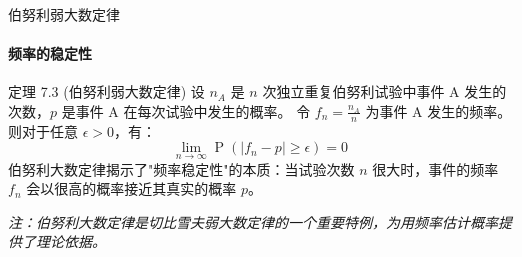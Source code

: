 \documentclass[UTF8]{beamer}
\DeclareMathOperator{\Prob}{\operatorname{P}}
\begin{document}
\begin{frame}{伯努利弱大数定律}
    \framesubtitle{频率的稳定性}
    \begin{block}{定理 7.3 (伯努利弱大数定律)}
        设 $n_A$ 是 $n$ 次独立重复伯努利试验中事件 A 发生的次数，$p$ 是事件 A 在每次试验中发生的概率。
        令 $f_n = \frac{n_A}{n}$ 为事件 A 发生的频率。
        则对于任意 $\epsilon > 0$，有：
        \[ \lim_{n \to \infty} \Prob\left(\left| f_n - p \right| \geq \epsilon\right) = 0 \]
        伯努利大数定律揭示了"\alert{频率稳定性}"的本质：当试验次数 $n$ 很大时，事件的频率 $f_n$ 会以很高的概率接近其真实的概率 $p$。
    \end{block}
    \vspace{0.3cm}
    \footnotesize
    \textit{注：伯努利大数定律是切比雪夫弱大数定律的一个重要特例，为用频率估计概率提供了理论依据。}
\end{frame}
\end{document}
